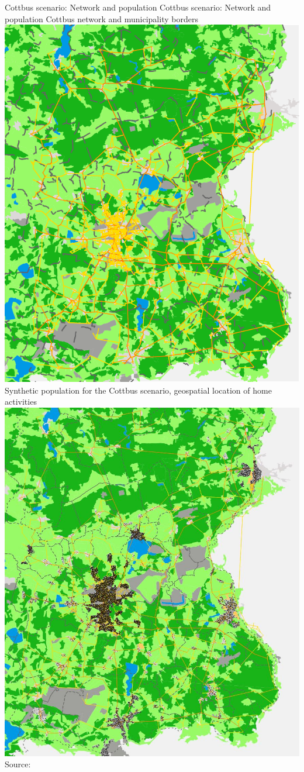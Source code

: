 \createfigure%
{Cottbus scenario: Network and population}%
{Cottbus scenario: Network and population}%
{\label{fig:cottbus_network_population}}%
{%
  \createsubfigure%
	{Cottbus network and municipality borders}
	{\includegraphics[width=0.49\linewidth]{./scenarios/figures/2013_network_gemeinden_landuse_edit.pdf}}
	{\label{fig:network_municipalities_cottbus_landuse}}
  \createsubfigure%
	{Synthetic population for the Cottbus scenario, geospatial location of home activities}
	{\includegraphics[width=0.49\linewidth]{./scenarios/figures/2013_network_gemeinden_landuse_population_home.jpg}}
	{\label{fig:cottbus_population_home}}
}%
{Source:~\citet{Grether2014PhD}} 

